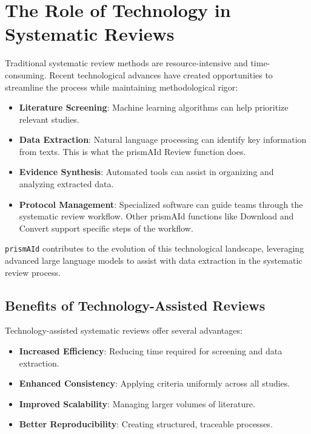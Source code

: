 \section{The Role of Technology in Systematic Reviews}

Traditional systematic review methods are resource-intensive and time-consuming. Recent technological advances have created opportunities to streamline the process while maintaining methodological rigor:

\begin{itemize}
    \item \textbf{Literature Screening}: Machine learning algorithms can help prioritize relevant studies.
    \item \textbf{Data Extraction}: Natural language processing can identify key information from texts. This is what the prismAId Review function does.
    \item \textbf{Evidence Synthesis}: Automated tools can assist in organizing and analyzing extracted data.
    \item \textbf{Protocol Management}: Specialized software can guide teams through the systematic review workflow. Other prismAId functions like Download and Convert support specific steps of the workflow.
\end{itemize}

\texttt{prismAId} contributes to the evolution of this technological landscape, leveraging advanced large language models to assist with data extraction in the systematic review process.

\subsection{Benefits of Technology-Assisted Reviews}

Technology-assisted systematic reviews offer several advantages:

\begin{itemize}
    \item \textbf{Increased Efficiency}: Reducing time required for screening and data extraction.
    \item \textbf{Enhanced Consistency}: Applying criteria uniformly across all studies.
    \item \textbf{Improved Scalability}: Managing larger volumes of literature.
    \item \textbf{Better Reproducibility}: Creating structured, traceable processes.
\end{itemize}

